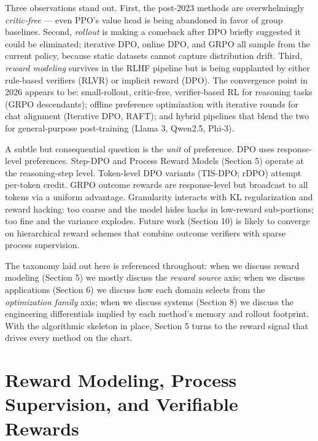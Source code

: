 \documentclass{article}
\begin{document}
Three observations stand out. First, the post-2023 methods are overwhelmingly \emph{critic-free} --- even PPO's value head is being abandoned in favor of group baselines. Second, \emph{rollout} is making a comeback after DPO briefly suggested it could be eliminated; iterative DPO, online DPO, and GRPO all sample from the current policy, because static datasets cannot capture distribution drift. Third, \emph{reward modeling} survives in the RLHF pipeline but is being supplanted by either rule-based verifiers (RLVR) or implicit reward (DPO). The convergence point in 2026 appears to be: small-rollout, critic-free, verifier-based RL for reasoning tasks (GRPO descendants); offline preference optimization with iterative rounds for chat alignment (Iterative DPO, RAFT); and hybrid pipelines that blend the two for general-purpose post-training (Llama 3, Qwen2.5, Phi-3).

A subtle but consequential question is the \emph{unit} of preference. DPO uses response-level preferences. Step-DPO and Process Reward Models (Section 5) operate at the reasoning-step level. Token-level DPO variants (TIS-DPO; rDPO) attempt per-token credit. GRPO outcome rewards are response-level but broadcast to all tokens via a uniform advantage. Granularity interacts with KL regularization and reward hacking: too coarse and the model hides hacks in low-reward sub-portions; too fine and the variance explodes. Future work (Section 10) is likely to converge on hierarchical reward schemes that combine outcome verifiers with sparse process supervision.

The taxonomy laid out here is referenced throughout: when we discuss reward modeling (Section 5) we mostly discuss the \emph{reward source} axis; when we discuss applications (Section 6) we discuss how each domain selects from the \emph{optimization family} axis; when we discuss systems (Section 8) we discuss the engineering differentials implied by each method's memory and rollout footprint. With the algorithmic skeleton in place, Section 5 turns to the reward signal that drives every method on the chart.

\section{Reward Modeling, Process Supervision, and Verifiable Rewards}\label{reward-modeling-process-supervision-and-verifiable-rewards}
\end{document}

